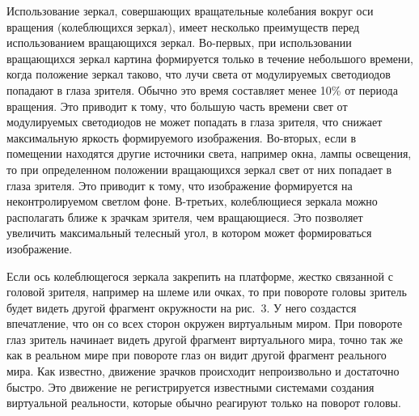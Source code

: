 \begin{multicols}{2}
  Использование зеркал, совершающих вращательные колебания вокруг оси вращения 
(ко\-леб\-лю\-щих\-ся зеркал), имеет несколько преимуществ перед использованием 
вращающихся зеркал. Во-пер\-вых, при использовании вращающихся зеркал картина 
формируется только в течение небольшого времени, когда положение зеркал таково, что 
лучи света от модулируемых светодиодов попадают в глаза зрителя. Обычно это время 
составляет менее 10\% от периода вращения. Это приводит к тому, что б$\acute{\mbox{о}}$льшую часть 
времени свет от модулируемых светодиодов не может попадать в глаза зрителя, что 
снижает максимальную яркость формируемого изображения. Во-вторых, если в 
помещении находятся другие источники света, например окна, лампы освещения, то при 
определенном положении вращающихся зеркал свет от них попадает в глаза зрителя. Это 
приводит к тому, что изображение формируется на неконтролируемом светлом фоне. 
  В-третьих, колеблющиеся зеркала можно располагать ближе к зрачкам зрителя, чем 
вращающиеся. Это позволяет увеличить максимальный телесный угол, в котором может 
формироваться изображение. 
  
  Если ось колеблющегося зеркала закрепить на платформе, жестко связанной с головой 
зрителя, например на шлеме или очках, то при повороте головы зритель будет видеть 
другой фрагмент окружности на рис.~3. У него создастся впечатление, что он со 
всех сторон окружен виртуальным миром. При повороте глаз зритель начинает видеть 
другой фрагмент виртуального мира, точно так же как в реальном мире при повороте глаз 
он видит другой фрагмент реального мира. Как известно, движение зрачков происходит 
непроизвольно и достаточно быстро. Это движение не регистрируется известными 
системами создания виртуальной реальности, которые обычно реагируют только на 
поворот головы.

  \begin{figure*} %
\vspace*{1pt}
\begin{center}
\mbox{%
\epsfxsize=152.511mm
}
\end{center}
\vspace*{-9pt}
  \end{figure*}
  

\end{multicols}
